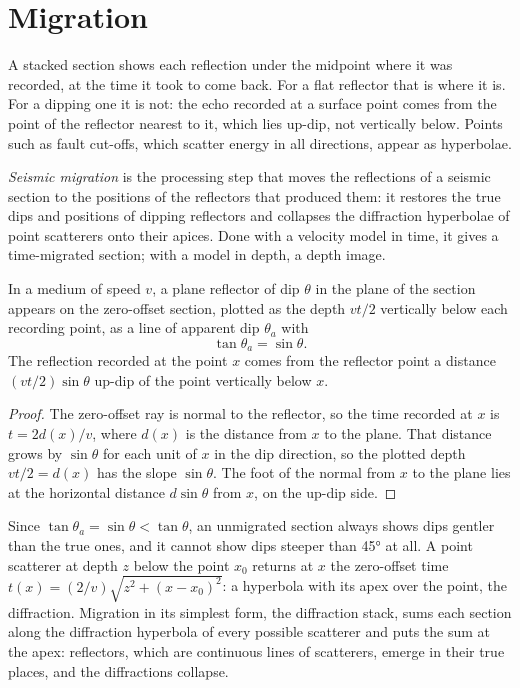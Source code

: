\section{Migration}

A stacked section shows each reflection under the midpoint where it was
recorded, at the time it took to come back. For a flat reflector that is where
it is. For a dipping one it is not: the echo recorded at a surface point comes
from the point of the reflector nearest to it, which lies up-dip, not
vertically below. Points such as fault cut-offs, which scatter energy in all
directions, appear as hyperbolae.

\begin{definition}\label{def:b3:exploration-seismology:migration}
\emph{Seismic migration} is the processing step that
moves the reflections of a seismic section to the positions of the reflectors
that produced them: it restores the true dips and positions of dipping
reflectors and collapses the diffraction hyperbolae of point scatterers onto
their apices. Done with a velocity model in time, it gives a time-migrated
section; with a model in depth, a depth image.
\end{definition}

\begin{theorem}\label{thm:b3:exploration-seismology:dip}
In a medium of speed $v$, a plane reflector of dip $\theta$ in the plane of the
section appears on the zero-offset section, plotted as the depth $vt/2$
vertically below each recording point, as a line of apparent dip $\theta_a$
with
\[
  \tan\theta_a = \sin\theta .
\]
The reflection recorded at the point $x$ comes from the reflector point a
distance $(vt/2)\sin\theta$ up-dip of the point vertically below $x$.
\end{theorem}

\begin{proof}
The zero-offset ray is normal to the reflector, so the time recorded at $x$ is
$t = 2d(x)/v$, where $d(x)$ is the distance from $x$ to the plane. That distance
grows by $\sin\theta$ for each unit of $x$ in the dip direction, so the plotted
depth $vt/2 = d(x)$ has the slope $\sin\theta$. The foot of the normal from $x$
to the plane lies at the horizontal distance $d\sin\theta$ from $x$, on the
up-dip side.
\end{proof}

Since $\tan\theta_a = \sin\theta < \tan\theta$, an unmigrated section always
shows dips gentler than the true ones, and it cannot show dips steeper than
\ang{45} at all. A point scatterer at depth $z$ below the point $x_0$ returns at
$x$ the zero-offset time $t(x) = (2/v)\sqrt{z^2 + (x - x_0)^2}$: a hyperbola with
its apex over the point, the diffraction. Migration in its simplest form,
the diffraction stack, sums each section along the diffraction hyperbola of
every possible scatterer and puts the sum at the apex: reflectors, which are
continuous lines of scatterers, emerge in their true places, and the
diffractions collapse.

